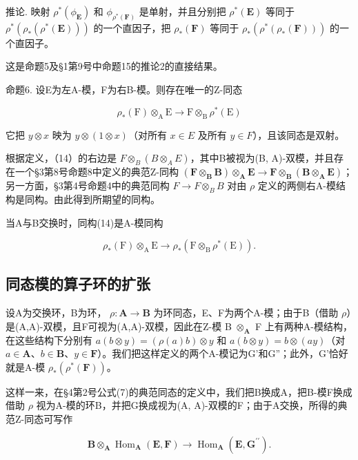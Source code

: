 推论. 映射 \(\rho^{*}(\phi_{\mathbf{E}})\) 和 \(\phi_{\rho^{*}(\mathbf{F})}\) 是单射，并且分别把 \(\rho^{*}(\mathbf{E})\) 等同于 \(\rho^{*}(\rho_{*}(\rho^{*}(\mathbf{E})))\) 的一个直因子，把 \(\rho_{*}(\mathbf{F})\) 等同于 \(\rho_{*}(\rho^{*}(\rho_{*}(\mathbf{F})))\) 的一个直因子。

这是命题5及§1第9号中命题15的推论2的直接结果。

命题6. 设E为左A-模，F为右B-模。则存在唯一的Z-同态

\[
\rho_ {*} (\mathrm{F}) \otimes_ {\mathrm{A}} \mathrm{E} \rightarrow \mathrm{F} \otimes_ {\mathrm{B}} \rho^ {*} (\mathrm{E})\tag{14}
\]

它把 \(y \otimes x\) 映为 \(y \otimes (1 \otimes x)\)（对所有 \(x \in E\) 及所有 \(y \in F\)），且该同态是双射。

根据定义，（14）的右边是 \(F \otimes_{B} (B \otimes_{A} E)\)，其中B被视为(B, A)-双模，并且存在一个§3第8号命题8中定义的典范Z-同构 \((\mathbf{F} \otimes_{\mathbf{B}} \mathbf{B}) \otimes_{\mathbf{A}} \mathbf{E} \to \mathbf{F} \otimes_{\mathbf{B}} (\mathbf{B} \otimes_{\mathbf{A}} \mathbf{E})\)；另一方面，§3第4号命题4中的典范同构 \(F \to F \otimes_{B} B\) 对由 \(\rho\) 定义的两侧右A-模结构是同构。由此得到所期望的同构。

当A与B交换时，同构(14)是A-模同构

\[
\rho_ {*} (\mathrm{F}) \otimes_ {\mathrm{A}} \mathrm{E} \rightarrow \rho_ {*} (\mathrm{F} \otimes_ {\mathrm{B}} \rho^ {*} (\mathrm{E})).
\]

\subsection{同态模的算子环的扩张}

设A为交换环，B为环， \(\rho: \mathbf{A} \to \mathbf{B}\) 为环同态，E、F为两个A-模；由于B（借助 \(\rho\)）是(A,A)-双模，且F可视为(A,A)-双模，因此在Z-模 B \(\otimes_{\mathbf{A}}\) F 上有两种A-模结构，在这些结构下分别有 \(a(b \otimes y) = (\rho(a)b) \otimes y\) 和 \(a(b \otimes y) = b \otimes (ay)\)（对 \(a \in \mathbf{A}\)、\(b \in \mathbf{B}\)、\(y \in \mathbf{F}\)）。我们把这样定义的两个A-模记为G'和G''；此外，G'恰好就是A-模 \(\rho_*(\rho^*(\mathbf{F}))\)。

这样一来，在§4第2号公式(7)的典范同态的定义中，我们把B换成A，把B-模F换成借助 \(\rho\) 视为A-模的环B，并把G换成视为(A, A)-双模的F；由于A交换，所得的典范Z-同态可写作

\[
\mathbf {B} \otimes_ {\mathbf {A}} \operatorname{Hom} _ {\mathbf {A}} (\mathbf {E}, \mathbf {F}) \rightarrow \operatorname{Hom} _ {\mathbf {A}} (\mathbf {E}, \mathbf {G} ^ {\prime \prime}).\tag{15}
\]

